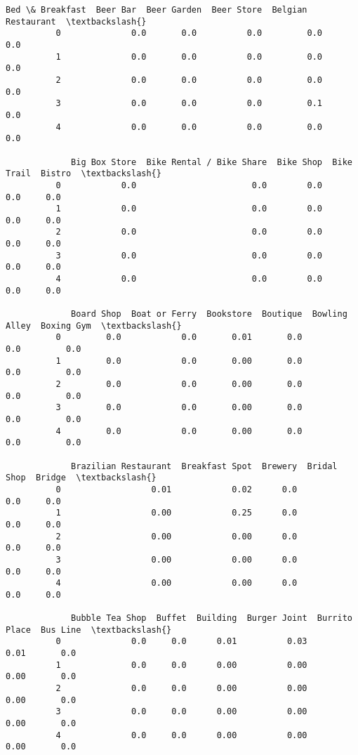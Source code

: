 \documentclass[11pt]{article}
\begin{document}
\begin{Verbatim}[commandchars=\\\{\}]
             Bed \& Breakfast  Beer Bar  Beer Garden  Beer Store  Belgian Restaurant  \textbackslash{}
          0              0.0       0.0          0.0         0.0                 0.0   
          1              0.0       0.0          0.0         0.0                 0.0   
          2              0.0       0.0          0.0         0.0                 0.0   
          3              0.0       0.0          0.0         0.1                 0.0   
          4              0.0       0.0          0.0         0.0                 0.0   
          
             Big Box Store  Bike Rental / Bike Share  Bike Shop  Bike Trail  Bistro  \textbackslash{}
          0            0.0                       0.0        0.0         0.0     0.0   
          1            0.0                       0.0        0.0         0.0     0.0   
          2            0.0                       0.0        0.0         0.0     0.0   
          3            0.0                       0.0        0.0         0.0     0.0   
          4            0.0                       0.0        0.0         0.0     0.0   
          
             Board Shop  Boat or Ferry  Bookstore  Boutique  Bowling Alley  Boxing Gym  \textbackslash{}
          0         0.0            0.0       0.01       0.0            0.0         0.0   
          1         0.0            0.0       0.00       0.0            0.0         0.0   
          2         0.0            0.0       0.00       0.0            0.0         0.0   
          3         0.0            0.0       0.00       0.0            0.0         0.0   
          4         0.0            0.0       0.00       0.0            0.0         0.0   
          
             Brazilian Restaurant  Breakfast Spot  Brewery  Bridal Shop  Bridge  \textbackslash{}
          0                  0.01            0.02      0.0          0.0     0.0   
          1                  0.00            0.25      0.0          0.0     0.0   
          2                  0.00            0.00      0.0          0.0     0.0   
          3                  0.00            0.00      0.0          0.0     0.0   
          4                  0.00            0.00      0.0          0.0     0.0   
          
             Bubble Tea Shop  Buffet  Building  Burger Joint  Burrito Place  Bus Line  \textbackslash{}
          0              0.0     0.0      0.01          0.03           0.01       0.0   
          1              0.0     0.0      0.00          0.00           0.00       0.0   
          2              0.0     0.0      0.00          0.00           0.00       0.0   
          3              0.0     0.0      0.00          0.00           0.00       0.0   
          4              0.0     0.0      0.00          0.00           0.00       0.0   
          

\end{Verbatim}
\end{document}
